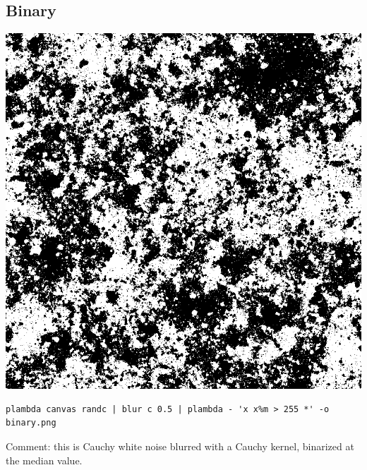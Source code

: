 \subsection{Binary}
\includegraphics{binary.png}
\begin{verbatim}
plambda canvas randc | blur c 0.5 | plambda - 'x x%m > 255 *' -o binary.png
\end{verbatim}
Comment: this is Cauchy white noise blurred with a Cauchy kernel, binarized
at the median value.

